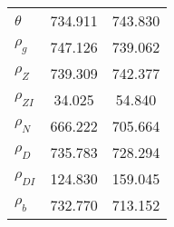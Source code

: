 \begin{center}
\begin{longtable}{lcc}
$ {\theta}            $	 & 	     734.911	 & 	     743.830 \\ 
$ {\rho_g}            $	 & 	     747.126	 & 	     739.062 \\ 
$ {\rho_Z}            $	 & 	     739.309	 & 	     742.377 \\ 
$ {\rho_{ZI}}         $	 & 	      34.025	 & 	      54.840 \\ 
$ {\rho_N}            $	 & 	     666.222	 & 	     705.664 \\ 
$ {\rho_D}            $	 & 	     735.783	 & 	     728.294 \\ 
$ {\rho_{DI}}         $	 & 	     124.830	 & 	     159.045 \\ 
$ {\rho_b}            $	 & 	     732.770	 & 	     713.152 \\ 
\end{longtable}
 \end{center}
